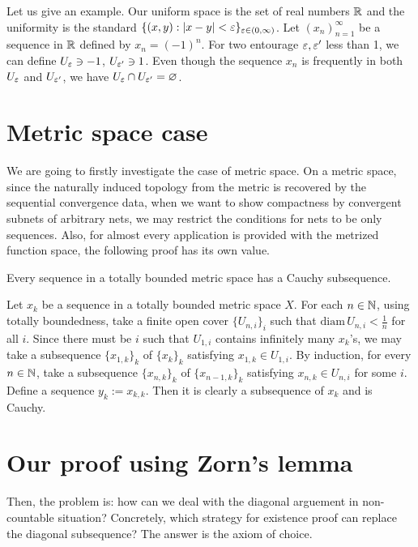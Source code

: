 \documentclass[11pt]{amsart}
\begin{document}
Let us give an example.
Our uniform space is the set of real numbers $\mathbb{R}$ and the uniformity is the standard $\{(x,y):|x-y|<\varepsilon\}_{\varepsilon\in(0,\infty)}$.
Let $(x_n)_{n=1}^\infty$ be a sequence in $\mathbb{R}$ defined by $x_n=(-1)^n$.
For two entourage $\varepsilon,\varepsilon'$ less than 1, we can define $U_\varepsilon\ni-1$, $U_{\varepsilon'}\ni1$.
Even though the sequence $x_n$ is frequently in both $U_\varepsilon$ and $U_{\varepsilon'}$, we have $U_\varepsilon\cap U_{\varepsilon'}=\varnothing$.



\section{Metric space case}

We are going to firstly investigate the case of metric space.
On a metric space, since the naturally induced topology from the metric is recovered by the sequential convergence data, when we want to show compactness by convergent subnets of arbitrary nets, we may restrict the conditions for nets to be only sequences.
Also, for almost every application is provided with the metrized function space, the following proof has its own value.


\begin{thm}
Every sequence in a totally bounded metric space has a Cauchy subsequence.
\end{thm}

\begin{pf}
Let $x_k$ be a sequence in a totally bounded metric space $X$.
For each $n\in\mathbb{N}$, using totally boundedness, take a finite open cover $\{U_{n,i}\}_i$ such that $\mathrm{diam}\,U_{n,i}<\frac1n$ for all $i$.
Since there must be $i$ such that $U_{1,i}$ contains infinitely many $x_k$'s, we may take a subsequence $\{x_{1,k}\}_k$ of $\{x_k\}_k$ satisfying $x_{1,k}\in U_{1,i}$.
By induction, for every $n\in\mathbb{N}$, take a subsequence $\{x_{n,k}\}_k$ of $\{x_{n-1,k}\}_k$ satisfying $x_{n,k}\in U_{n,i}$ for some $i$.
Define a sequence $y_k:=x_{k,k}$.
Then it is clearly a subsequence of $x_k$ and is Cauchy.
\end{pf}





\section{Our proof using Zorn's lemma}

Then, the problem is: how can we deal with the diagonal arguement in non-countable situation?
Concretely, which strategy for existence proof can replace the diagonal subsequence?
The answer is the axiom of choice.
\end{document}
